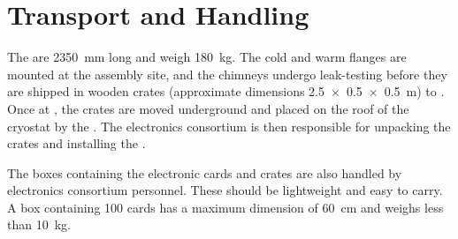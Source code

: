 \section{Transport and Handling}
\label{sec:dp-tpcelec-transport}

The  are \SI{2350}{\mm} long and weigh \SI{180}{\kg}.  The cold and warm flanges are mounted at the assembly site, and the chimneys undergo leak-testing before they are shipped in wooden crates (approximate dimensions \SI[product-units=power]{2.5x0.5x0.5}{m}) to . Once at , the crates are moved underground and placed on the roof of the cryostat by the . The \dual electronics consortium is then responsible for unpacking the crates and installing the . 

The boxes containing the electronic cards and  crates are also handled by \dual electronics consortium personnel. These should be lightweight and easy to carry. A box containing \num{100}  cards has a maximum dimension of \SI{60}{\cm} and weighs less than \SI{10}{\kg}. 

